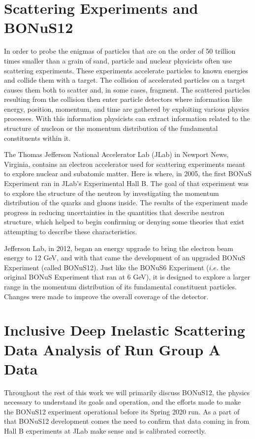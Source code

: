  \newpage
 \section{Scattering Experiments and BONuS12}
 In order to probe the enigmas of particles that are on the order of 50 trillion times smaller than a grain of sand, particle and nuclear physicists often use scattering experiments. These experiments accelerate particles to known energies and collide them with a target.  The collision of accelerated particles on a target causes them both to scatter and, in some cases, fragment. The scattered particles resulting from the collision then enter particle detectors where information like energy, position, momentum, and time are gathered by exploiting various physics processes. With this information physicists can extract information related to the structure of nucleon or the momentum distribution of the fundamental constituents within it.
 
 The Thomas Jefferson National Accelerator Lab (JLab) in Newport News, Virginia, contains an electron accelerator used for scattering experiments meant to explore nuclear and subatomic matter. Here is where, in 2005, the first BONuS Experiment ran in JLab's Experimental Hall B. The goal of that experiment was to explore the structure of the neutron by investigating the momentum distribution of the quarks and gluons inside. The results of the experiment made progress in reducing uncertainties in the quantities that describe neutron structure, which helped to begin confirming or denying some theories that exist attempting to describe these characteristics.
 
 Jefferson Lab, in 2012, began an energy upgrade to bring the electron beam energy to 12 GeV, and with that came the development of an upgraded BONuS Experiment (called BONuS12). Just like the BONuS6 Experiment ($i.e.$ the original BONuS Experiment that ran at 6 GeV), it is designed to explore a larger range in the momentum distribution of its fundamental constituent particles. Changes were made to improve the overall coverage of the detector.
 
\section{Inclusive Deep Inelastic Scattering Data Analysis of Run Group A Data}
Throughout the rest of this work we will primarily discuss BONuS12, the physics necessary to understand its goals and operation, and the efforts made to make the BONuS12 experiment operational before its Spring 2020 run. As a part of that BONuS12 development comes the need to confirm that data coming in from Hall B experiments at JLab make sense and is calibrated correctly. 

